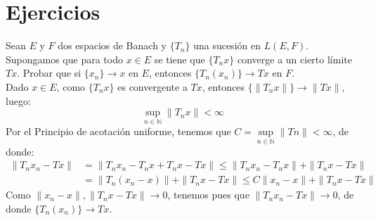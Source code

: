 \section{Ejercicios}
\begin{ejercicio}
    
\end{ejercicio}

\begin{ejercicio}
    
\end{ejercicio}

\begin{ejercicio}
    Sean $E$ y $F$ dos espacios de Banach y $\{T_n\}$ una sucesión en $L(E,F)$. Supongamos que para todo $x\in E$ se tiene que $\{T_nx\}$ converge a un cierto límite $Tx$. Probar que si $\{x_n\}\to x$ en $E$, entonces $\{T_n(x_n)\}\to Tx$ en $F$.\\

    \noindent
    Dado $x\in E$, como $\{T_nx\}$ es convergente a $Tx$, entonces $\{\|T_nx\|\}\to \|Tx\|$, luego:
    \begin{equation*}
        \sup_{n\in \mathbb{N}}\|T_nx\| < \infty
    \end{equation*}
    Por el Principio de acotación uniforme, tenemos que $C=\sup\limits_{n\in \mathbb{N}}\|Tn\| < \infty$, de donde:
    \begin{align*}
        \|T_nx_n - Tx\| &= \|T_nx_n - T_nx + T_nx - Tx\| \leq \|T_nx_n - T_nx\| + \|T_nx - Tx\| \\
                        &= \|T_n(x_n - x)\| + \|T_nx-Tx\| \leq C\|x_n-x\| + \|T_nx-Tx\|
    \end{align*}
    Como $\|x_n-x\|, \|T_nx-Tx\|\to 0$, tenemos pues que $\|T_nx_n - Tx\| \to 0$, de donde $\{T_n(x_n)\}\to Tx$.
\end{ejercicio}



